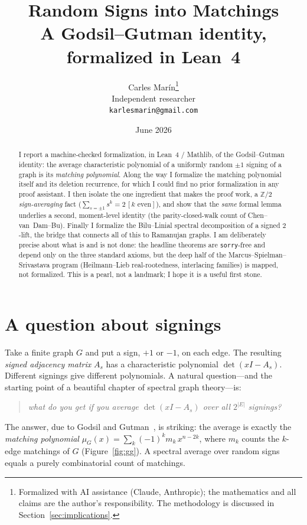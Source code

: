 \documentclass[11pt]{article}
\title{\bf Random Signs into Matchings\\[3pt]
  \large\normalfont A Godsil--Gutman identity, formalized in Lean~4}
\author{Carles Mar\'in\thanks{Formalized with AI assistance (Claude, Anthropic); the mathematics and all claims are the author's responsibility. The methodology is discussed in Section~\ref{sec:implications}.}\\[3pt]
  \normalsize Independent researcher\\
  \normalsize \texttt{karlesmarin@gmail.com}}
\date{June 2026}
\newcommand{\lean}[1]{\texttt{#1}}
\newcommand{\Z}{\mathbb{Z}}
\begin{document}
\maketitle

\begin{abstract}
I report a machine-checked formalization, in Lean~4 / Mathlib, of the
Godsil--Gutman identity: the average characteristic polynomial of a uniformly
random $\pm1$ signing of a graph is its \emph{matching polynomial}.
Along the way I formalize the matching polynomial itself and its deletion
recurrence, for which I could find no prior formalization in any proof
assistant. I then isolate the one ingredient that makes the proof work, a
$\Z/2$ \emph{sign-averaging} fact ($\sum_{s=\pm1}s^{k}=2\,[k\text{ even}]$), and
show that the \emph{same} formal lemma underlies a second, moment-level
identity (the parity-closed-walk count of Chen--van~Dam--Bu). Finally I
formalize the Bilu--Linial spectral decomposition of a signed $2$-lift, the
bridge that connects all of this to Ramanujan graphs.
I am deliberately precise about what is and is not done: the headline
theorems are \lean{sorry}-free and depend only on the three standard axioms,
but the deep half of the Marcus--Spielman--Srivastava program
(Heilmann--Lieb real-rootedness, interlacing families) is mapped, not
formalized. This is a pearl, not a landmark; I hope it is a useful first
stone.
\end{abstract}

\section{A question about signings}
\label{sec:intro}

Take a finite graph $G$ and put a sign, $+1$ or $-1$, on each edge. The
resulting \emph{signed adjacency matrix} $A_s$ has a characteristic polynomial
$\det(xI-A_s)$. Different signings give different polynomials. A natural
question---and the starting point of a beautiful chapter of spectral graph
theory---is:
\begin{quote}\itshape
  what do you get if you average $\det(xI-A_s)$ over all $2^{|E|}$ signings?
\end{quote}
The answer, due to Godsil and Gutman~\cite{GodsilGutman1981}, is striking: the
average is exactly the \emph{matching polynomial}
$\mu_G(x)=\sum_k(-1)^k m_k\,x^{n-2k}$, where $m_k$ counts the $k$-edge matchings
of $G$ (Figure~\ref{fig:gg}). A spectral average over random signs equals a
purely combinatorial count of matchings.
\end{document}
